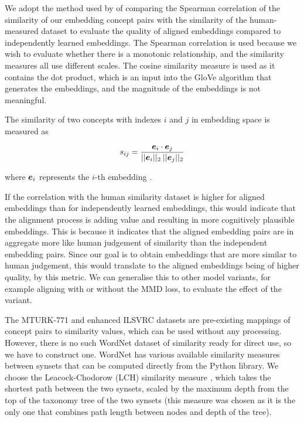 We adopt the method used by \cite{mturk771} of comparing the Spearman correlation of the similarity of our embedding concept pairs with the similarity of the human-measured dataset to evaluate the quality of aligned embeddings compared to independently learned embeddings. The Spearman correlation is used because we wish to evaluate whether there is a monotonic relationship, and the similarity measures all use different scales. The cosine similarity measure is used as it contains the dot product, which is an input into the GloVe algorithm that generates the embeddings, and the magnitude of the embeddings is not meaningful. 

The similarity of two concepts with indexes $i$ and $j$ in embedding space is measured as

\begin{equation}
s_{ij} = \frac{\boldsymbol{e}_i \cdot \boldsymbol{e}_j}{||\boldsymbol{e}_i||_2 \medspace ||\boldsymbol{e}_j||_2}
\end{equation}

where $\boldsymbol{e}_i$ represents the $i$-th embedding .

If the correlation with the human similarity dataset is higher for aligned embeddings than for independently learned embeddings, this would indicate that the alignment process is adding value and resulting in more cognitively plausible embeddings. This is because it indicates that the aligned embedding pairs are in aggregate more like human judgement of similarity than the independent embedding pairs. Since our goal is to obtain embeddings that are more similar to human judgement, this would translate to the aligned embeddings being of higher quality, by this metric. We can generalise this to other model variants, for example aligning with or without the MMD loss, to evaluate the effect of the variant. 

The MTURK-771 and enhanced ILSVRC datasets are pre-existing mappings of concept pairs to similarity values, which can be used without any processing. However, there is no such WordNet dataset of similarity ready for direct use, so we have to construct one. WordNet has various available similarity measures between synsets that can be computed directly from the Python library. We choose the Leacock-Chodorow (LCH) similarity measure \cite{LeacockChodorow}, which takes the shortest path between the two synsets, scaled by the maximum depth from the top of the taxonomy tree of the two synsets (this measure was chosen as it is the only one that combines path length between nodes and depth of the tree).  

